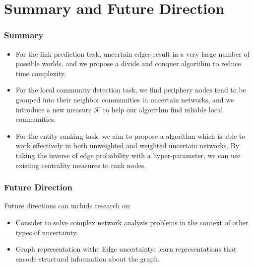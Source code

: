 \documentclass[9pt]{beamer}
\begin{document}
\section{Summary and Future Direction}
\begin{frame}
\frametitle{Summary}
\begin{itemize}
\item For the link prediction task, uncertain edges result in a very large number of possible worlds, and we propose a divide and conquer algorithm to reduce time complexity. 
\item For the local community detection task, we find periphery nodes tend to be grouped into their neighbor communities in uncertain networks, and we introduce a new measure $\mathcal{K}$ to help our algorithm find reliable local communities.
\item For the entity ranking task, we aim to propose a algorithm which is able to work effectively in both unweighted and weighted uncertain networks. By taking the inverse of edge probability with a hyper-parameter, we can use existing centrality measures to rank nodes. 
\end{itemize}
\end{frame}

\begin{frame}
\frametitle{Future Direction}
Future directions can include research on:
\begin{itemize}
\item Consider to solve complex network analysis problems in the context of other types of uncertainty.
\item Graph representation withe Edge uncertainty: learn representations that encode structural information about the graph.
\end{itemize}
\end{frame}




\end{document}
